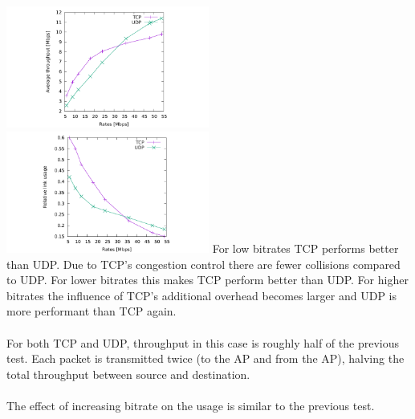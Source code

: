\includegraphics[width=0.5\textwidth]{traces/L3-2-1-tput.pdf}
\includegraphics[width=0.5\textwidth]{traces/L3-2-1-usage.pdf}
For low bitrates TCP performs better than UDP. Due to TCP's congestion control there are fewer collisions compared to UDP. For lower bitrates this makes TCP perform better than UDP. For higher bitrates the influence of TCP's additional overhead becomes larger and UDP is more performant than TCP again. \\ \\
For both TCP and UDP, throughput in this case is roughly half of the previous test. Each packet is transmitted twice (to the AP and from the AP), halving the total throughput between source and destination. \\ \\
 The effect of increasing bitrate on the usage is similar to the previous test.

